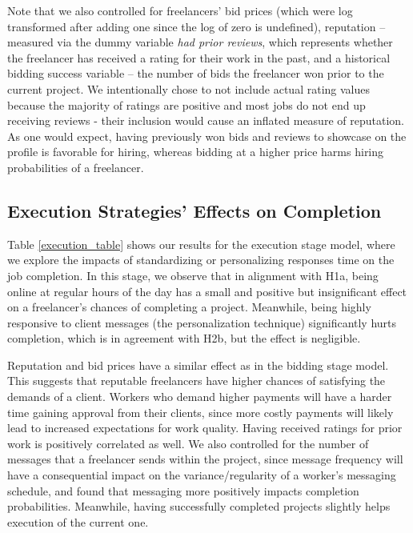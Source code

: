 Note that we also controlled for freelancers' bid prices (which were log transformed after adding one since the log of zero is undefined),  reputation -- measured via the dummy variable \textit{had prior reviews}, which represents whether the freelancer has received a rating for their work in the past, and a historical bidding success variable -- the number of bids the freelancer won prior to the current project. We intentionally chose to not include actual rating values because the majority of ratings are positive and most jobs do not end up receiving reviews - their inclusion would cause an inflated measure of reputation. As one would expect, {having previously won bids and} reviews {to showcase on the profile} is favorable for hiring, whereas bidding at a higher price harms hiring probabilities {of a freelancer}. 



\subsection{{Execution Strategies' Effects on Completion}}
Table \cref{execution_table} shows our results for the execution stage model, where we explore the impacts of standardizing or personalizing responses time on the job completion.
In this stage, we observe that { in alignment with H1a, being online at regular hours of the day has a small and positive but insignificant effect on a} freelancer's chances of completing a project.
Meanwhile, being highly responsive to client messages (the personalization technique) significantly hurts completion, {which is in agreement with H2b, but the effect is negligible}. 

Reputation and bid prices have a similar effect as in the bidding stage model. This suggests that reputable freelancers have higher chances of satisfying the demands of a client. Workers who demand higher payments will have a harder time gaining approval from their clients, since more costly payments {will likely} lead to increased expectations for work quality. {Having received ratings for prior work is positively correlated as well.} We also controlled for the number of messages that a freelancer sends within the project, since {message frequency} will have a consequential impact on the variance/regularity of a worker's messaging schedule, {and found that messaging more positively impacts completion probabilities. Meanwhile, having successfully completed projects slightly helps execution of the current one.}

